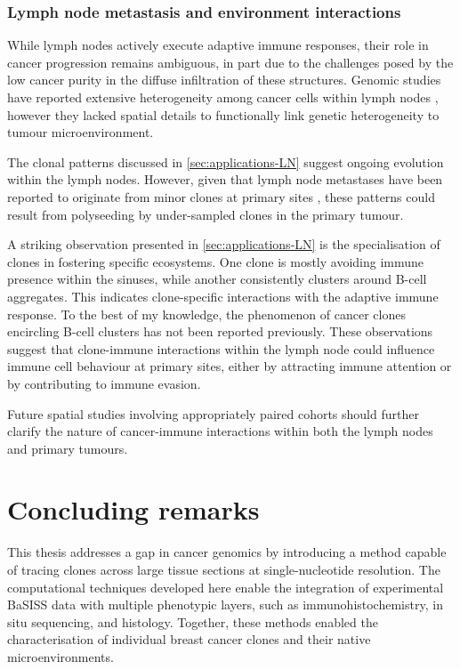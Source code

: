 \subsubsection*{Lymph node metastasis and environment interactions}

While lymph nodes actively execute adaptive immune responses, their role in cancer progression remains ambiguous, in part due to the challenges posed by the low cancer purity in the diffuse infiltration of these structures. Genomic studies have reported extensive heterogeneity among cancer cells within lymph nodes \parencite{Pal2021-rf,Barry2018-el,Bao2018-kj}, however they lacked spatial details to functionally link genetic heterogeneity to tumour microenvironment.

The clonal patterns discussed in \cref{sec:applications-LN} suggest ongoing evolution within the lymph nodes. However, given that lymph node metastases have been reported to originate from minor clones at primary sites \parencite{Bao2018-kj}, these patterns could result from polyseeding by under-sampled clones in the primary tumour.

A striking observation presented in \cref{sec:applications-LN} is the specialisation of clones in fostering specific ecosystems. One clone is mostly avoiding immune presence within the sinuses, while another consistently clusters around B-cell aggregates. This indicates clone-specific interactions with the adaptive immune response. To the best of my knowledge, the phenomenon of cancer clones encircling B-cell clusters has not been reported previously. These observations suggest that clone-immune interactions within the lymph node could influence immune cell behaviour at primary sites, either by attracting immune attention or by contributing to immune evasion.

Future spatial studies involving appropriately paired cohorts should further clarify the nature of cancer-immune interactions within both the lymph nodes and primary tumours.

\section{Concluding remarks}

This thesis addresses a gap in cancer genomics by introducing a method capable of tracing clones across large tissue sections at single-nucleotide resolution. The computational techniques developed here enable the integration of experimental \ac{BaSISS} data with multiple phenotypic layers, such as immunohistochemistry, in situ sequencing, and histology. Together, these methods enabled the characterisation of individual breast cancer clones and their native microenvironments. 

